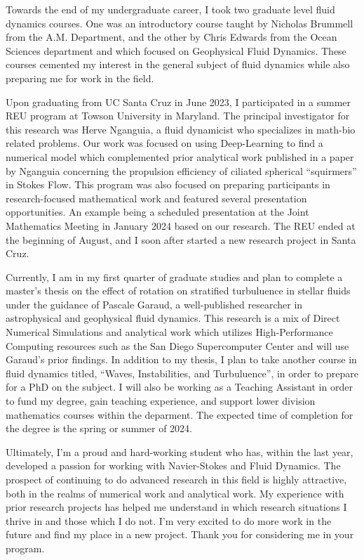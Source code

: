 \documentclass{article}
\begin{document}
Towards the end of my undergraduate career, I took two graduate level fluid dynamics courses. One was an introductory course taught by Nicholas Brummell from the A.M. Department, and the other by Chris Edwards from the Ocean Sciences department and which focused on Geophysical Fluid Dynamics. These courses cemented my interest in the general subject of fluid dynamics while also preparing me for work in the field. 

Upon graduating from UC Santa Cruz in June 2023, I participated in a summer REU program at Towson University in Maryland. The principal investigator for this research was Herve Nganguia, a fluid dynamicist who specializes in math-bio related problems. Our work was focused on using Deep-Learning to find a numerical model which complemented prior analytical work published in a paper by Nganguia concerning the propulsion efficiency of ciliated spherical ``squirmers'' in Stokes Flow. This program was also focused on preparing participants in research-focused mathematical work and featured several presentation opportunities. An example being a scheduled presentation at the Joint Mathematics Meeting in January 2024 based on our research. The REU ended at the beginning of August, and I soon after started a new research project in Santa Cruz. 

Currently, I am in my first quarter of graduate studies and plan to complete a master's thesis on the effect of rotation on stratified turbuluence in stellar fluids under the guidance of Pascale Garaud, a well-published researcher in astrophysical and geophysical fluid dynamics. This research is a mix of Direct Numerical Simulations and analytical work which utilizes High-Performance Computing resources such as the San Diego Supercomputer Center and will use Garaud's prior findings. In addition to my thesis, I plan to take another course in fluid dynamics titled, ``Waves, Instabilities, and Turbuluence'', in order to prepare for a PhD on the subject. I will also be working as a Teaching Assistant in order to fund my degree, gain teaching experience, and support lower division mathematics courses within the deparment. The expected time of completion for the degree is the spring or summer of 2024. 

Ultimately, I'm a proud and hard-working student who has, within the last year, developed a passion for working with Navier-Stokes and Fluid Dynamics. The prospect of continuing to do advanced research in this field is highly attractive, both in the realms of numerical work and analytical work. My experience with prior research projects has helped me understand in which research situations I thrive in and those which I do not. I'm very excited to do more work in the future and find my place in a new project. Thank you for considering me in your program. 
\end{document}
